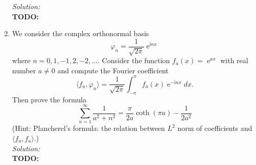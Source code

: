 \documentclass[10pt]{amsart}
\newcommand{\I}{\mathrm{i}}
\DeclareMathOperator{\E}{e}
\theoremstyle{nonumberplain}
\begin{document}
\begin{enumerate}[label={\bf {\arabic*}:}]
\noindent
\textit{Solution:} \\
\textbf{TODO:}

\newpage

\item We consider the complex orthonormal basis
$$
\varphi_n = \frac 1 {\sqrt{2 \pi}} \E^{\I n x}
$$
where $n = 0, 1, -1, 2, -2, ...$.
Consider the function $f_a(x) = \E^{ax}$ with real number $a \neq 0$ and compute the Fourier coefficient
$$
\langle f_a, \varphi_n \rangle = \frac 1 {\sqrt{2 \pi}} \int_{-\pi}^{\pi} f_a(x) \E^{- \I n x} dx.
$$
Then prove the formula
$$
\sum_{n = 1}^\infty \frac {1}{a^2 + n^2} = \frac \pi {2a} \coth (\pi a)  - \frac 1 {2a^2}
$$
(Hint: Plancherel’s formula: the relation between $L^2$ norm of coefficients and $\langle f_a, f_a \rangle$.)
\\

\noindent
\textit{Solution:} \\
\textbf{TODO: }
\end{enumerate}
\end{document}
